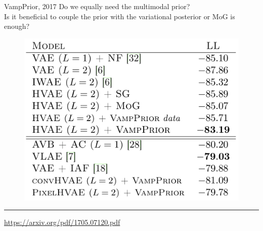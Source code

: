 \documentclass{beamer}
\begin{document}
\begin{frame}{VampPrior, 2017}
Do we equally need the multimodal prior? \\
\vspace{0.2cm}
Is it beneficial to couple the prior with the variational posterior or MoG is enough?
\begin{figure}
    \centering
    \includegraphics[width=0.5\linewidth]{figs/VampPrior_1.png}
\end{figure}
\vfill
\hrule\medskip
{\scriptsize \href{https://arxiv.org/pdf/1705.07120.pdf}{https://arxiv.org/pdf/1705.07120.pdf}}
\end{frame}
\end{document}
